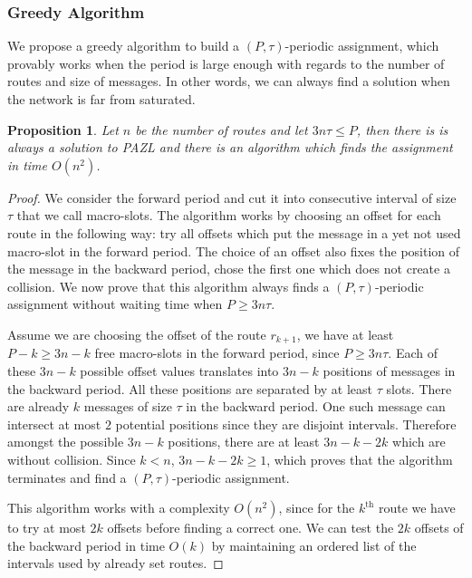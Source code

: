 \documentclass[a4paper,10pt]{article}
\newtheorem{proposition}{Proposition}
\begin{document}
   
    \subsubsection*{Greedy Algorithm}
    
    We propose a greedy algorithm to build a $(P,\tau)$-periodic assignment, which provably works when
    the period is large enough with regards to the number of routes and size of messages. In other words, 
    we can always find a solution when the network is far from saturated. 
    
    \begin{proposition}
    Let  $n$ be the number of routes and let $ 3n\tau \leq P$, then there is is always a solution to PAZL and there is an  algorithm which finds the assignment in time $O(n^2)$.
    \end{proposition}
    \begin{proof}
     We consider the forward period and cut it into consecutive interval of size $\tau$ that we call macro-slots. The algorithm works by choosing an offset for each route in the following way: try all offsets which put the message in a yet not used macro-slot in the forward
     period. The choice of an offset also fixes the position of the message in the backward period, chose the first one which does not create a collision. We now prove that this algorithm always finds a $(P,\tau)$-periodic assignment without waiting time when $P \geq 3n\tau$.
     
     Assume we are choosing the offset of the route $r_{k+1}$, we have at least $P - k \geq 3n - k$ free macro-slots in the forward period, since $P \geq 3n\tau$. Each of these $3n - k$ possible offset values translates into $3n - k$ positions of messages in the backward period. All these positions are separated by at least $\tau$ slots. There are already $k$ messages of size $\tau$ in the backward period. One such message can intersect at most $2$ potential positions since they are disjoint intervals. Therefore  amongst the possible $3n - k$ positions, there are  at least $3n - k -2k$ which are without collision. Since $k < n$, $3n - k -2k \geq 1$, which proves that the algorithm terminates and find a  $(P,\tau)$-periodic assignment. 
     
     This algorithm works with a complexity $O(n^2)$, since for the $k^{\text{th}}$ route we have to try at most $2k$ offsets before finding a correct one. We can test the $2k$ offsets of the backward period in time $O(k)$ by maintaining an ordered list of the intervals used by already set routes.
     \end{proof}
     
\end{document}
